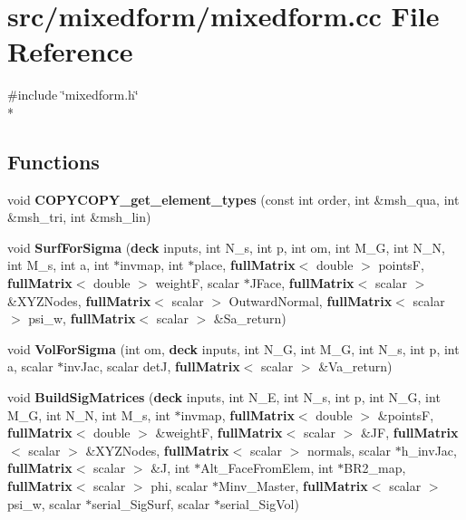 \section{src/mixedform/mixedform.cc File Reference}
\label{mixedform_8cc}
{\ttfamily \#include \char`\"{}mixedform.\-h\char`\"{}}\\*
\subsection*{Functions}
\begin{DoxyCompactItemize}
\item 
void {\bfseries C\-O\-P\-Y\-C\-O\-P\-Y\-\_\-get\-\_\-element\-\_\-types} (const int order, int \&msh\-\_\-qua, int \&msh\-\_\-tri, int \&msh\-\_\-lin)\label{mixedform_8cc_a25f554c64d191f60722540ae44d22af4}

\item 
void {\bfseries Surf\-For\-Sigma} ({\bf deck} inputs, int N\-\_\-s, int p, int om, int M\-\_\-\-G, int N\-\_\-\-N, int M\-\_\-s, int a, int $\ast$invmap, int $\ast$place, {\bf full\-Matrix}$<$ double $>$ points\-F, {\bf full\-Matrix}$<$ double $>$ weight\-F, scalar $\ast$J\-Face, {\bf full\-Matrix}$<$ scalar $>$ \&X\-Y\-Z\-Nodes, {\bf full\-Matrix}$<$ scalar $>$ Outward\-Normal, {\bf full\-Matrix}$<$ scalar $>$ psi\-\_\-w, {\bf full\-Matrix}$<$ scalar $>$ \&Sa\-\_\-return)\label{mixedform_8cc_ab164e79cf9f6099d5998ceb0b4732b7c}

\item 
void {\bfseries Vol\-For\-Sigma} (int om, {\bf deck} inputs, int N\-\_\-\-G, int M\-\_\-\-G, int N\-\_\-s, int p, int a, scalar $\ast$inv\-Jac, scalar det\-J, {\bf full\-Matrix}$<$ scalar $>$ \&Va\-\_\-return)\label{mixedform_8cc_a38a6a6616acc60797d6248aae1de9b5a}

\item 
void {\bfseries Build\-Sig\-Matrices} ({\bf deck} inputs, int N\-\_\-\-E, int N\-\_\-s, int p, int N\-\_\-\-G, int M\-\_\-\-G, int N\-\_\-\-N, int M\-\_\-s, int $\ast$invmap, {\bf full\-Matrix}$<$ double $>$ \&points\-F, {\bf full\-Matrix}$<$ double $>$ \&weight\-F, {\bf full\-Matrix}$<$ scalar $>$ \&J\-F, {\bf full\-Matrix}$<$ scalar $>$ \&X\-Y\-Z\-Nodes, {\bf full\-Matrix}$<$ scalar $>$ normals, scalar $\ast$h\-\_\-inv\-Jac, {\bf full\-Matrix}$<$ scalar $>$ \&J, int $\ast$Alt\-\_\-\-Face\-From\-Elem, int $\ast$B\-R2\-\_\-map, {\bf full\-Matrix}$<$ scalar $>$ phi, scalar $\ast$Minv\-\_\-\-Master, {\bf full\-Matrix}$<$ scalar $>$ psi\-\_\-w, scalar $\ast$serial\-\_\-\-Sig\-Surf, scalar $\ast$serial\-\_\-\-Sig\-Vol)\label{mixedform_8cc_a96849be7a101c7a4c3ab6082c51cce75}


\end{DoxyCompactItemize}

